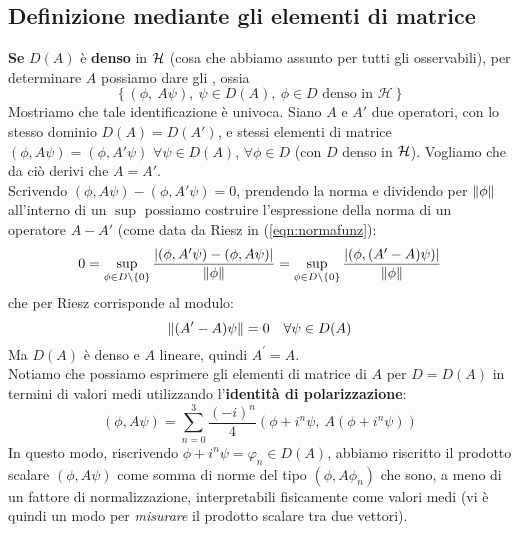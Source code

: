 \documentclass[FisicaTeorica.tex]{subfiles}
\begin{document}
\subsection{Definizione mediante gli elementi di matrice}
\textbf{Se} $D(A)$ è \textbf{denso} in $\mathcal{H}$ (cosa che abbiamo assunto per tutti gli osservabili), per determinare $A$ possiamo dare gli , ossia 
\[
\left\{\left(\phi,\ A\psi\right),\ \psi\in D\left(A\right),\ \phi\in D\text{\ denso\ in\ }\mathcal{H}\right\}
\]
Mostriamo che tale identificazione è univoca. Siano $A$ e $A'$ due operatori, con lo stesso dominio $D(A) = D(A')$, e stessi elementi di matrice $(\phi, A\psi) = (\phi, A'\psi)$ $\forall \psi \in D(A)$, $\forall \phi \in D$ (con $D$ denso in $\mathcal{H}$). Vogliamo che da ciò derivi che $A = A'$.\\
Scrivendo $(\phi, A\psi)-(\phi, A'\psi) = 0$, prendendo la norma e dividendo per $\left\lVert\phi\right\rVert$ all'interno di un $\sup$ possiamo costruire l'espressione della norma di un operatore $A-A'$ (come data da Riesz in (\ref{eqn:normafunz}): 
\[ 0 = \sup_{\phi \in D\setminus \{0\}}\frac{|(\phi, A'\psi)-(\phi, A\psi)|}{\left\lVert\phi\right\rVert} = \sup_{\phi\in D\setminus\{0\}} \frac{|(\phi, (A'-A)\psi)|}{\left\lVert\phi\right\rVert}
\]
che per Riesz corrisponde al modulo: %
\[
\left\lVert(A'-A)\psi\right\rVert = 0 \quad \forall \psi \in D(A)
\] 
	Ma $D(A)$ è denso e $A$ lineare, quindi $A^\prime=A$.\\
	Notiamo che possiamo esprimere gli elementi di matrice di $A$ per $D=D(A)$ in termini di valori medi utilizzando l'\textbf{identità di polarizzazione}:
	\[
	\left(\phi, A\psi\right)= \sum_{n=0}^{3}{\frac{\left(-i\right)^n}{4}(\phi+i^n\psi,\ A\left(\phi+i^n\psi\right))}
	\]
	In questo modo, riscrivendo $\phi + i^n\psi = \varphi_n \in D(A)$, abbiamo riscritto il prodotto scalare $(\phi, A\psi)$ come somma di norme del tipo $(\phi, A\phi_n)$ che sono, a meno di un fattore di normalizzazione, interpretabili fisicamente come valori medi (vi è quindi un modo per \textit{misurare} il prodotto scalare tra due vettori).
\end{document}
